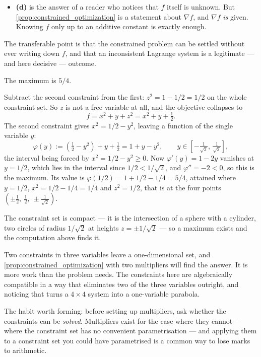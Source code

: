 \begin{exercisesolution}
\begin{remark}
\begin{itemize}
    section a circle and does nothing to the first Lagrange equation, which is where the
    obstruction lives.
  \item \textbf{(d)} is the answer of a reader who notices that $f$ itself is unknown. But
    \cref{prop:constrained_optimization} is a statement about $\nabla f$, and $\nabla f$ \emph{is}
    given. Knowing $f$ only up to an additive constant is exactly enough.
\end{itemize}
The transferable point is that the constrained problem can be settled without ever writing down
$f$, and that an inconsistent Lagrange system is a legitimate --- and here decisive --- outcome.
\end{remark}
\end{exercisesolution}

\begin{exercisesolution}
\label{sol:kobel_sphere_meets_cylinder}
The maximum is $\boxed{5/4}$.

Subtract the second constraint from the first: $z^2 = 1 - 1/2 = 1/2$ on the whole constraint set.
So $z$ is not a free variable at all, and the objective collapses to
\[f = x^2 + y + z^2 = x^2 + y + \tfrac12 .\]
The second constraint gives $x^2 = 1/2 - y^2$, leaving a function of the single variable $y$:
\[\varphi(y) := \left(\tfrac12 - y^2\right) + y + \tfrac12 = 1 + y - y^2,
  \qquad y \in \left[-\tfrac{1}{\sqrt2},\,\tfrac{1}{\sqrt2}\right],\]
the interval being forced by $x^2 = 1/2-y^2 \ge 0$. Now $\varphi'(y) = 1-2y$ vanishes at
$y = 1/2$, which lies in the interval since $1/2 < 1/\sqrt2$, and $\varphi'' = -2 < 0$, so this is
the maximum. Its value is $\varphi(1/2) = 1 + 1/2 - 1/4 = 5/4$, attained where $y = 1/2$,
$x^2 = 1/2-1/4 = 1/4$ and $z^2 = 1/2$, that is at the four points
$\left(\pm\tfrac12,\ \tfrac12,\ \pm\tfrac{1}{\sqrt2}\right)$.

The constraint set is compact --- it is the intersection of a sphere with a cylinder, two circles
of radius $1/\sqrt{2}$ at heights $z = \pm 1/\sqrt2$ --- so a maximum exists and the computation
above finds it.
\begin{remark}
\label{rem:constraints_before_multipliers}
Two constraints in three variables leave a one-dimensional set, and \cref{prop:constrained_optimization}
with two multipliers will find the answer. It is more work than the problem needs. The constraints
here are algebraically compatible in a way that eliminates two of the three variables outright, and
noticing that turns a $4 \times 4$ system into a one-variable parabola.

The habit worth forming: before setting up multipliers, ask whether the constraints can be
\emph{solved}. Multipliers exist for the case where they cannot --- where the constraint set has no
convenient parametrisation --- and applying them to a constraint set you could have parametrised is
a common way to lose marks to arithmetic.
\end{remark}
\end{exercisesolution}

